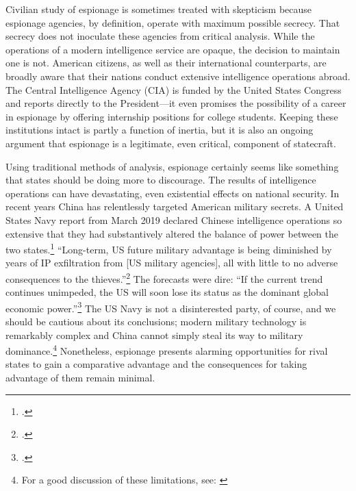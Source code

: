 \documentclass[14pt]{extarticle}
\begin{document}
Civilian study of espionage is sometimes treated with skepticism because espionage agencies, by definition, operate with maximum possible secrecy. That secrecy does not inoculate these agencies from critical analysis. While the operations of a modern intelligence service are opaque, the decision to maintain one is not. American citizens, as well as their international counterparts, are broadly aware that their nations conduct extensive intelligence operations abroad. The Central Intelligence Agency (CIA) is funded by the United States Congress and reports directly to the President---it even promises the possibility of a career in espionage by offering internship positions for college students. Keeping these institutions intact is partly a function of inertia, but it is also an ongoing argument that espionage is a legitimate, even critical, component of statecraft.

Using traditional methods of analysis, espionage certainly seems like something that states should be doing more to discourage. The results of intelligence operations can have devastating, even existential effects on national security. In recent years China has relentlessly targeted American military secrets. A United States Navy report from March 2019 declared Chinese intelligence operations so extensive that they had substantively altered the balance of power between the two states.\footcite{lubold_navy_2019} \enquote{Long-term, US future military advantage is being diminished by years of IP exfiltration from [US military agencies], all with little to no adverse consequences to the thieves.}\footcite[p.~6]{bayer_cybersecurity_2019} The forecasts were dire: \enquote{If the current trend continues unimpeded, the US will soon lose its status as the dominant global economic power.}\footcite[p.~5]{bayer_cybersecurity_2019} The US Navy is not a disinterested party, of course, and we should be cautious about its conclusions; modern military technology is remarkably complex and China cannot simply steal its way to military dominance.\footnote{For a good discussion of these limitations, see: \cite{gilli_why_2019}} Nonetheless, espionage presents alarming opportunities for rival states to gain a comparative advantage and the consequences for taking advantage of them remain minimal.

\end{document}
